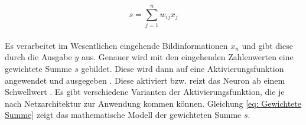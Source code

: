 		\begin{equation}
			s=\sum_{j=1}^n w_{ij}x_j
			\label{eq: Gewichtete Summe}
		\end{equation}
		\\
		
		 Es verarbeitet im Wesentlichen eingehende Bildinformationen $x_n$ und gibt diese durch die Ausgabe $y$ aus. Genauer wird mit den eingehenden Zahlenwerten eine gewichtete Summe $s$ gebildet. Diese wird dann auf eine Aktivierungsfunktion angewendet und ausgegeben \cite{bildv2020}. Diese aktiviert bzw. reizt das Neuron ab einem Schwellwert \cite{Kriesel}. Es gibt verschiedene Varianten der Aktivierungsfunktion, die je nach Netzarchitektur zur Anwendung kommen können. Gleichung \ref{eq: Gewichtete Summe} zeigt das mathematische Modell der gewichteten Summe $s$.\\
		
		
				
